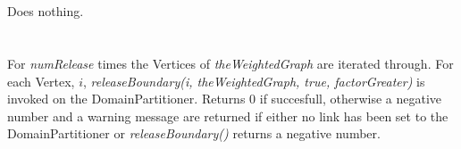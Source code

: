  \\
  \\ 
Does nothing. \\

 \\
 \\ 
For {\em numRelease} times the Vertices of {\em theWeightedGraph} are
iterated through. For each Vertex, $i$, {\em releaseBoundary(i,
theWeightedGraph, true, factorGreater)} is invoked on
the DomainPartitioner. Returns $0$ if succesfull, otherwise a negative
number and a warning message are returned if either no link has been
set to the DomainPartitioner or {\em releaseBoundary()} returns a
negative number. \\ 



